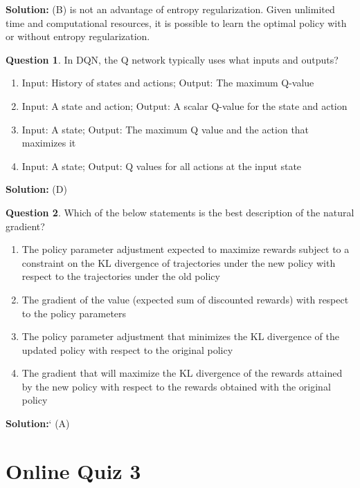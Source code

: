 \documentclass{article}
\theoremstyle{definition}
\newtheorem{question}{Question}
\begin{document}
\noindent\textbf{Solution:}
(B) is not an advantage of entropy regularization. Given unlimited time and computational resources, it is possible to learn the optimal policy with or without entropy regularization.

\begin{question}
In DQN, the Q network typically uses what inputs and outputs?
\begin{enumerate}[label=(\Alph*)]
\item Input: History of states and actions; Output: The maximum Q-value
\item Input: A state and action; Output: A scalar Q-value for the state and action
\item Input: A state; Output: The maximum Q value and the action that maximizes it
\item Input: A state; Output: Q values for all actions at the input state
\end{enumerate}
\end{question}

\noindent\textbf{Solution:}
(D)

\begin{question}
Which of the below statements is the best description of the natural gradient?

\begin{enumerate}[label=(\Alph*)]
\item The policy parameter adjustment expected to maximize rewards subject to a constraint on the KL divergence of trajectories under the new policy with respect to the trajectories under the old policy
\item The gradient of the value (expected sum of discounted rewards) with respect to the policy parameters
\item The policy parameter adjustment that minimizes the KL divergence of the updated policy with respect to the original policy
\item The gradient that will maximize the KL divergence of the rewards attained by the new policy with respect to the rewards obtained with the original policy
\end{enumerate}

\end{question}

\noindent\textbf{Solution:}`
(A)

\section*{Online Quiz 3}
\end{document}
